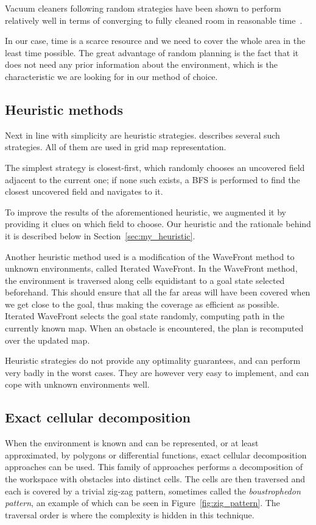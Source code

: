\documentclass[buriama8_dp.tex]{subfiles}
\begin{document}
Vacuum cleaners following random strategies have been shown to perform relatively well in terms of converging to fully cleaned room in reasonable time~\cite{randomcover}.

In our case, time is a scarce resource and we need to cover the whole area in the least time possible. The great advantage of random planning is the fact that it does not need any prior information about the environment, which is the characteristic we are looking for in our method of choice.

\subsection{Heuristic methods}
\label{subsec:heuritic}
Next in line with simplicity are heuristic strategies. \cite{rt_heuristic_coverage} describes several such strategies. All of them are used in grid map representation.

The simplest strategy is closest-first, which randomly chooses an uncovered field adjacent to the current one; if none such exists, a BFS is performed to find the closest uncovered field and navigates to it.

To improve the results of the aforementioned heuristic, we augmented it by providing it clues on which field to choose. Our heuristic and the rationale behind it is described below in Section~\ref{sec:my_heuristic}.

Another heuristic method used is a modification of the WaveFront method \cite{wavefront} to unknown environments, called Iterated WaveFront. In the WaveFront method, the environment is traversed along cells equidistant to a goal state selected beforehand. This should ensure that all the far areas will have been covered when we get close to the goal, thus making the coverage as efficient as possible. Iterated WaveFront selects the goal state randomly, computing path in the currently known map. When an obstacle is encountered, the plan is recomputed over the updated map.

Heuristic strategies do not provide any optimality guarantees, and can perform very badly in the worst cases. They are however very easy to implement, and can cope with unknown environments well. 

\subsection{Exact cellular decomposition}
\label{subsec:label}
When the environment is known and can be represented, or at least approximated, by polygons or differential functions, exact cellular decomposition approaches can be used. This family of approaches performs a decomposition of the workspace with obstacles into distinct cells. The cells are then traversed and each is covered by a trivial zig-zag pattern, sometimes called the \textit{boustrophedon pattern}, an example of which can be seen in Figure~\ref{fig:zig_pattern}. The traversal order is where the complexity is hidden in this technique.
\end{document}
